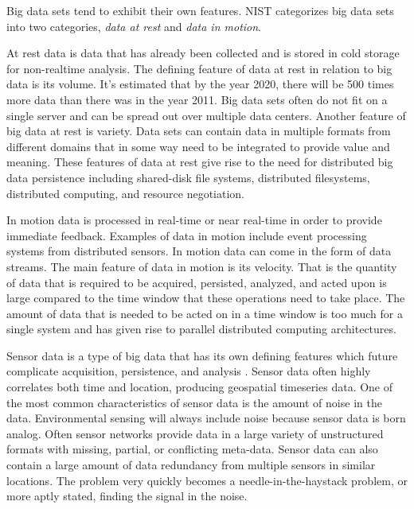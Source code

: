 \documentclass[]{article}
\begin{document}
Big data sets tend to exhibit their own features. NIST categorizes big data sets into two categories, \textit{data at rest} and \textit{data in motion}. 

At rest data is data that has already been collected and is stored in cold storage for  non-realtime analysis. The defining feature of data at rest in relation to big data is its volume. It's estimated that by the year 2020, there will be 500 times more data than there was in the year 2011. Big data sets often do not fit on a single server and can be spread out over multiple data centers. Another feature of big data at rest is variety. Data sets can contain data in multiple formats from different domains that in some way need to be integrated to provide value and meaning.  These features of data at rest give rise to the need for distributed big data persistence including shared-disk file systems, distributed filesystems, distributed computing, and resource negotiation.  

In motion data is processed in real-time or near real-time in order to provide immediate feedback. Examples of data in motion include event processing systems from distributed sensors. In motion data can come in the form of data streams. The main feature of data in motion is its velocity. That is the quantity of data that is required to be acquired, persisted, analyzed, and acted upon is large compared to the time window that these operations need to take place. The amount of data that is needed to be acted on in a time window is too much for a single system and has given rise to parallel distributed computing architectures.

Sensor data is a type of big data that has its own defining features which future complicate acquisition, persistence, and analysis \cite{chen_big_2014}. Sensor data often highly correlates both time and location, producing geospatial timeseries data. One of the most common characteristics of sensor data is the amount of noise in the data. Environmental sensing will always include noise because sensor data is born analog\cite{pcast}. Often sensor networks provide data in a large variety of unstructured formats with missing, partial, or conflicting meta-data. Sensor data can also contain a large amount of data redundancy from multiple sensors in similar locations. The problem very quickly becomes a needle-in-the-haystack problem, or more aptly stated, finding the signal in the noise.
\end{document}
